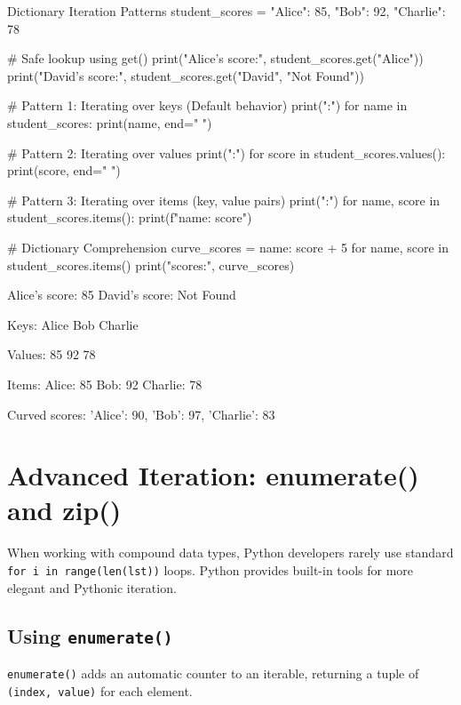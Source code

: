 \begin{pythoncode}[]{Dictionary Iteration Patterns}
student_scores = {"Alice": 85, "Bob": 92, "Charlie": 78}

# Safe lookup using get()
print("Alice's score:", student_scores.get("Alice"))
print("David's score:", student_scores.get("David", "Not Found"))

# Pattern 1: Iterating over keys (Default behavior)
print("\nKeys:")
for name in student_scores:
    print(name, end=" ")

# Pattern 2: Iterating over values
print("\nValues:")
for score in student_scores.values():
    print(score, end=" ")

# Pattern 3: Iterating over items (key, value pairs)
print("\nItems:")
for name, score in student_scores.items():
    print(f"{name}: {score}")
    
# Dictionary Comprehension
curve_scores = {name: score + 5 for name, score in student_scores.items()}
print("\nCurved scores:", curve_scores)
\end{pythoncode}

\begin{outputbox}
Alice's score: 85
David's score: Not Found

Keys:
Alice Bob Charlie 

Values:
85 92 78 

Items:
Alice: 85
Bob: 92
Charlie: 78

Curved scores: {'Alice': 90, 'Bob': 97, 'Charlie': 83}
\end{outputbox}

\section{Advanced Iteration: enumerate() and zip()}

When working with compound data types, Python developers rarely use standard \texttt{for i in range(len(lst))} loops. Python provides built-in tools for more elegant and Pythonic iteration.

\subsection{Using \texttt{enumerate()}}
\texttt{enumerate()} adds an automatic counter to an iterable, returning a tuple of \texttt{(index, value)} for each element.

